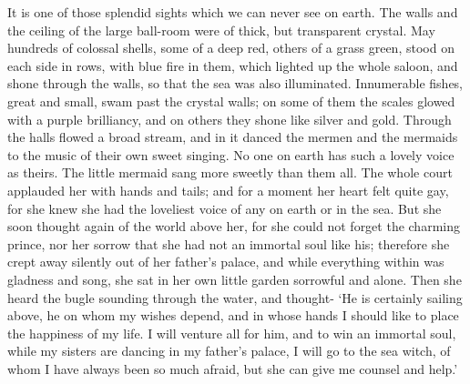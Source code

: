 It is one of those splendid sights which we can never see on
earth. 
The walls and the ceiling of the large ball-room were of thick,
but transparent crystal. 
May hundreds of colossal shells, some of a
deep red, others of a grass green, stood on each side in rows, with
blue fire in them, which lighted up the whole saloon, and shone
through the walls, so that the sea was also illuminated. 
Innumerable
fishes, great and small, swam past the crystal walls; on some of
them the scales glowed with a purple brilliancy, and on others they
shone like silver and gold. 
Through the halls flowed a broad stream,
and in it danced the mermen and the mermaids to the music of their own
sweet singing. 
No one on earth has such a lovely voice as theirs.
The little mermaid sang more sweetly than them all. 
The whole court
applauded her with hands and tails; and for a moment her heart felt
quite gay, for she knew she had the loveliest voice of any on earth or
in the sea. 
But she soon thought again of the world above her, for she
could not forget the charming prince, nor her sorrow that she had
not an immortal soul like his; therefore she crept away silently out
of her father's palace, and while everything within was gladness and
song, she sat in her own little garden sorrowful and alone. 
Then she
heard the bugle sounding through the water, and thought- `He is
certainly sailing above, he on whom my wishes depend, and in whose
hands I should like to place the happiness of my life. 
I will
venture all for him, and to win an immortal soul, while my sisters are
dancing in my father's palace, I will go to the sea witch, of whom I
have always been so much afraid, but she can give me counsel and
help.'

